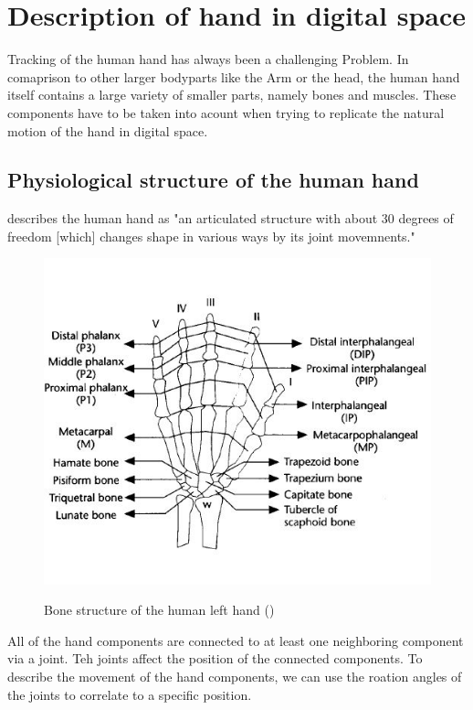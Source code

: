 

\chapter{Description of hand in digital space}
Tracking of the human hand has always been a challenging Problem. In comaprison to other larger bodyparts like the Arm or the head, the human hand itself contains a large variety of smaller parts, namely bones and muscles. These components have to be taken into acount when trying to replicate the natural motion of the hand in digital space.\\
\section{Physiological structure of the human hand}
\label{p}
\citep{LEE.1995} describes the human hand as "an articulated structure with about 30 degrees of freedom [which] changes shape in various ways by its joint movemnents."
\begin{figure}[H]
	\includegraphics[scale=0.8]{images/hand.jpg}
	\label{Handstructure} 
	\caption{Bone structure of the human left hand (\cite{LEE.1995})}
\end{figure}
All of the hand components are connected to at least one neighboring component via a joint. Teh joints affect the position of the connected components. To describe the movement of the hand components, we can use the roation angles of the joints to correlate to a specific position.\\
